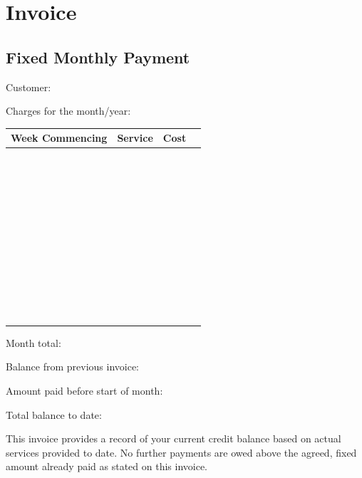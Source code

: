 \documentclass[a4paper]{article}
\begin{document}
\section{Invoice}

\subsection{Fixed Monthly Payment}

Customer: \underline{\hspace{4cm}}

Charges for the month/year: \underline{\hspace{4cm}}

\vspace{1cm}

\begin{table}[h]
  \def\arraystretch{2.0}
  \begin{tabularx}{\textwidth}{|X|X|X|X|}
    \hline
    Week Commencing & Service & Cost \\
    \hline
    ~ & ~ & \\
    \hline
    ~ & ~ & \\
    \hline
    ~ & ~ & \\
    \hline
    ~ & ~ & \\
    \hline
    ~ & ~ & \\
    \hline
    ~ & ~ & \\
    \hline
    ~ & ~ & \\
    \hline
    ~ & ~ & \\
    \hline
    ~ & ~ & \\
    \hline
    ~ & ~ & \\
    \hline
  \end{tabularx}
\end{table}

\vspace{1cm}

Month total: \underline{\hspace{4cm}}

Balance from previous invoice: \underline{\hspace{4cm}}

Amount paid before start of month: \underline{\hspace{4cm}}

Total balance to date: \underline{\hspace{4cm}}

This invoice provides a record of your current credit balance based on actual
services provided to date. No further payments are owed above the agreed, fixed
amount already paid as stated on this invoice.


\end{document}

